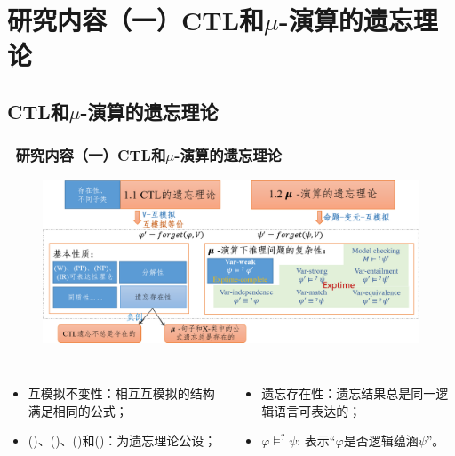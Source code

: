 \documentclass[aspectratio=1610, 9pt, CJK]{beamer}
\begin{document}
	
\section{研究内容（一）CTL和$\mu$-演算的遗忘理论}
\subsection{CTL和$\mu$-演算的遗忘理论}  
\begin{frame}  
	\frametitle{~研究内容（一）CTL和$\mu$-演算的遗忘理论}
	\begin{figure}
		\includegraphics[scale=0.45]{figures/ctlMuForgFrame1}
	\end{figure}
	{\tiny 
		\begin{columns}
			\begin{itemize} 
				\item 互模拟不变性：相互互模拟的结构满足相同的公式；
				\item (\W)、(\PP)、(\NgP)和(\IR)：为遗忘理论公设；
			\end{itemize}
			\begin{itemize}
				\item 遗忘存在性：遗忘结果总是同一逻辑语言可表达的；
				\item $\varphi \models^? \psi$: 表示“$\varphi$是否逻辑蕴涵$\psi$”。
			\end{itemize}
		\end{columns}
	}

\end{frame}
\end{document}
